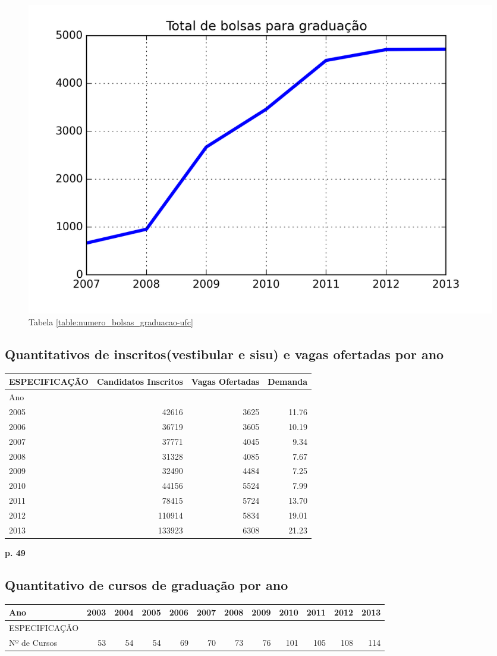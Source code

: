 \documentclass{report}
\begin{document}
\begin{figure}[H]
	\includegraphics{img/numero_bolsas_graduacao_ufc.png}
	\caption{Tabela \ref{table:numero_bolsas_graduacao-ufc}}
	\label{img:numer_bolsas_graduacao-ufc}
\end{figure}

\subsection{Quantitativos de inscritos(vestibular e sisu) e vagas ofertadas por ano}
\begin{tabular}{lrrr}
\toprule
ESPECIFICAÇÃO &  Candidatos Inscritos &  Vagas Ofertadas &  Demanda \\
\midrule
Ano  &                       &                  &          \\
2005 &  42616 &  3625 &  11.76 \\
2006 &  36719 &  3605 &  10.19 \\
2007 &  37771 &  4045 &  9.34 \\
2008 &  31328 &  4085 &  7.67 \\
2009 &  32490 &  4484 &  7.25 \\
2010 &  44156 &  5524 &  7.99 \\
2011 &  78415 &  5724 &  13.70 \\
2012 &  110914 &  5834 &  19.01 \\
2013 &  133923 &  6308 &  21.23 \\
\bottomrule
\end{tabular}

\textbf{p. 49}

\subsection{Quantitativo de cursos de graduação por ano}
\begin{tabular}{lrrrrrrrrrrr}
\toprule
Ano &  2003 &  2004 &  2005 &  2006 &  2007 &  2008 &  2009 &  2010 &  2011 &  2012 &  2013 \\
\midrule
ESPECIFICAÇÃO &       &       &       &       &       &       &       &       &       &       &       \\
Nº de Cursos  &  53 &  54 &  54 &  69 &  70 &  73 &  76 &  101 &  105 &  108 &  114 \\
\bottomrule
\end{tabular}
\end{document}
